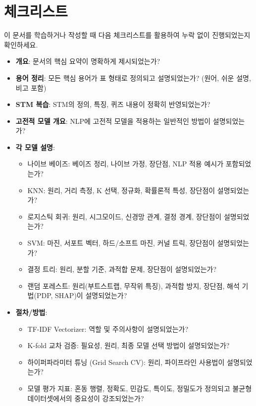 \documentclass[11pt,a4paper]{article}
\theoremstyle{definition}
\begin{document}
\newpage
\section*{체크리스트}

이 문서를 학습하거나 작성할 때 다음 체크리스트를 활용하여 누락 없이 진행되었는지 확인하세요.

\begin{tcolorbox}[title=\textbf{학습/작성/검토 체크리스트}, colback=myblue!10, colframe=blue!75!black, boxrule=0.8pt, arc=4pt]
\begin{itemize}
    \item \textbf{개요}: 문서의 핵심 요약이 명확하게 제시되었는가?
    \item \textbf{용어 정리}: 모든 핵심 용어가 표 형태로 정의되고 설명되었는가? (원어, 쉬운 설명, 비고 포함)
    \item \textbf{STM 복습}: STM의 정의, 특징, 퀴즈 내용이 정확히 반영되었는가?
    \item \textbf{고전적 모델 개요}: NLP에 고전적 모델을 적용하는 일반적인 방법이 설명되었는가?
    \item \textbf{각 모델 설명}:
    \begin{itemize}
        \item 나이브 베이즈: 베이즈 정리, 나이브 가정, 장단점, NLP 적용 예시가 포함되었는가?
        \item KNN: 원리, 거리 측정, K 선택, 정규화, 확률론적 특성, 장단점이 설명되었는가?
        \item 로지스틱 회귀: 원리, 시그모이드, 신경망 관계, 결정 경계, 장단점이 설명되었는가?
        \item SVM: 마진, 서포트 벡터, 하드/소프트 마진, 커널 트릭, 장단점이 설명되었는가?
        \item 결정 트리: 원리, 분할 기준, 과적합 문제, 장단점이 설명되었는가?
        \item 랜덤 포레스트: 원리(부트스트랩, 무작위 특징), 과적합 방지, 장단점, 해석 기법(PDP, SHAP)이 설명되었는가?
    \end{itemize}
    \item \textbf{절차/방법}:
    \begin{itemize}
        \item TF-IDF Vectorizer: 역할 및 주의사항이 설명되었는가?
        \item K-fold 교차 검증: 필요성, 원리, 최종 모델 선택 방법이 설명되었는가?
        \item 하이퍼파라미터 튜닝 (Grid Search CV): 원리, 파이프라인 사용법이 설명되었는가?
        \item 모델 평가 지표: 혼동 행렬, 정확도, 민감도, 특이도, 정밀도가 정의되고 불균형 데이터셋에서의 중요성이 강조되었는가?

\end{itemize}
\end{itemize}
\end{tcolorbox}
\end{document}
